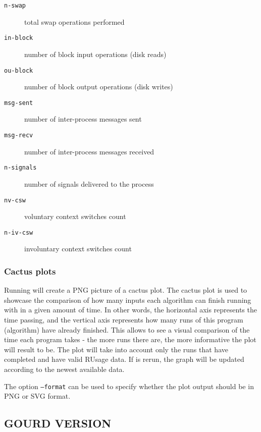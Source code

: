 \documentclass[a4paper,english]{article}
\begin{document}
\begin{adjustwidth}{18pt}{0pt}
\begin{description}
                    \item[\texttt{n-swap}] total swap operations performed
                    \item[\texttt{in-block}] number of block input operations (disk reads)
                    \item[\texttt{ou-block}] number of block output operations (disk writes)
                    \item[\texttt{msg-sent}] number of inter-process messages sent
                    \item[\texttt{msg-recv}] number of inter-process messages received
                    \item[\texttt{n-signals}] number of signals delivered to the process
                    \item[\texttt{nv-csw}] voluntary context switches count
                    \item[\texttt{n-iv-csw}] involuntary context switches count
                \end{description}

            \subsubsection{Cactus plots}
                Running    will create a PNG picture of
                a cactus plot.
                The cactus plot is used to showcase the comparison of how many inputs each algorithm
                can finish running with in a given amount of time.
                In other words, the horizontal axis represents the time passing, and the vertical axis
                represents how many runs of this program (algorithm) have already finished.
                This allows to see a visual comparison of the time each program takes - the more runs
                there are, the more informative the plot will result to be.
                The plot will take into account only the runs that have completed and have valid
                RUsage data. If    is rerun, the graph will be updated
                according to the newest available data.

                The option \texttt{--format} can be used to specify whether the plot output
                should be in PNG or SVG format.

        \subsection{GOURD VERSION}


\end{adjustwidth}
\end{document}
